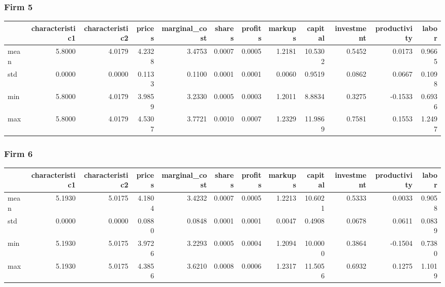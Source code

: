  \subsubsection*{Firm 5}
\begin{tabular}{lrrrrrrrrrrr}
\toprule
{} &  characteristic1 &  characteristic2 &  prices &  marginal\_cost &  shares &  profits &  markups &  capital &  investment &  productivity &  labor \\
\midrule
mean &           5.8000 &           4.0179 &  4.2328 &         3.4753 &  0.0007 &   0.0005 &   1.2181 &  10.5302 &      0.5452 &        0.0173 & 0.9665 \\
std  &           0.0000 &           0.0000 &  0.1133 &         0.1100 &  0.0001 &   0.0001 &   0.0060 &   0.9519 &      0.0862 &        0.0667 & 0.1098 \\
min  &           5.8000 &           4.0179 &  3.9859 &         3.2330 &  0.0005 &   0.0003 &   1.2011 &   8.8834 &      0.3275 &       -0.1533 & 0.6936 \\
max  &           5.8000 &           4.0179 &  4.5307 &         3.7721 &  0.0010 &   0.0007 &   1.2329 &  11.9869 &      0.7581 &        0.1553 & 1.2497 \\
\bottomrule
\end{tabular}


 \subsubsection*{Firm 6}
\begin{tabular}{lrrrrrrrrrrr}
\toprule
{} &  characteristic1 &  characteristic2 &  prices &  marginal\_cost &  shares &  profits &  markups &  capital &  investment &  productivity &  labor \\
\midrule
mean &           5.1930 &           5.0175 &  4.1804 &         3.4232 &  0.0007 &   0.0005 &   1.2213 &  10.6021 &      0.5333 &        0.0033 & 0.9058 \\
std  &           0.0000 &           0.0000 &  0.0880 &         0.0848 &  0.0001 &   0.0001 &   0.0047 &   0.4908 &      0.0678 &        0.0611 & 0.0839 \\
min  &           5.1930 &           5.0175 &  3.9726 &         3.2293 &  0.0005 &   0.0004 &   1.2094 &  10.0000 &      0.3864 &       -0.1504 & 0.7380 \\
max  &           5.1930 &           5.0175 &  4.3856 &         3.6210 &  0.0008 &   0.0006 &   1.2317 &  11.5056 &      0.6932 &        0.1275 & 1.1019 \\
\bottomrule
\end{tabular}


